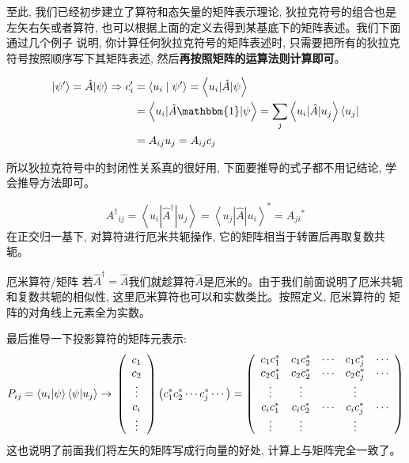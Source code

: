 至此, 我们已经初步建立了算符和态矢量的矩阵表示理论, 狄拉克符号的组合也是左矢右矢或者算符, 也可以根据上面的定义去得到某基底下的矩阵表述。我们下面通过几个例子
说明, 你计算任何狄拉克符号的矩阵表述时, 只需要把所有的狄拉克符号按照顺序写下其矩阵表述, 然后\textbf{再按照矩阵的运算法则计算即可}。

\begin{equation*}
    \begin{aligned}
        \left|\psi^{\prime}\right\rangle=\hat{A}|\psi\rangle \Rightarrow c_{i}^{\prime} &=\left\langle u_{i} \mid \psi^{\prime}\right\rangle=\left\langle u_{i}|\hat{A}| \psi\right\rangle \\
        &=\left\langle u_{i}|\hat{A} \mathbbm{1}| \psi\right\rangle=\sum_{j}\left\langle u_{i}|\hat{A}| u_{j}\right\rangle\left\langle u_{j}\right| \\
        &=A_{i j} u_{j}=A_{i j} c_{j}
    \end{aligned}
\end{equation*}
\begin{thinknote}
    所以狄拉克符号中的封闭性关系真的很好用, 下面要推导的式子都不用记结论, 学会推导方法即可。
\end{thinknote}
\begin{equation*}
    \boxed{
        A^{\dagger}{ }_{i j}=\left\langle u_{i}\left|\hat{A}^{\dagger}\right| u_{j}\right\rangle=\left\langle u_{j}|\hat{A}| u_{i}\right\rangle^{*}=A_{j i}{ }^{*}
    }
    \end{equation*}
在正交归一基下, 对算符进行厄米共轭操作, 它的矩阵相当于转置后再取复数共轭。
\begin{define}{厄米算符/矩阵}
    若$\hat{A}^\dagger=\hat{A}$我们就趁算符$\hat{A}$是厄米的。由于我们前面说明了厄米共轭和复数共轭的相似性, 这里厄米算符也可以和实数类比。按照定义, 厄米算符的
    矩阵的对角线上元素全为实数。
\end{define}
最后推导一下投影算符的矩阵元表示:
\begin{equation*}
    P_{ij} =\left\langle u_i|\psi\right\rangle\left\langle\psi| u_j \right\rangle\rightarrow\\
    \left(\begin{array}{c}
        c_{1} \\
        c_{2} \\
        \vdots \\
        c_{i} \\
        \vdots
        \end{array}\right)\left(c_{1}^{*} c_{2}^{*} \cdots c_{j}^{*} \cdots\right)=\left(\begin{array}{ccccc}
        c_{1} c_{1}^{*} & c_{1} c_{2}^{*} & \cdots & c_{1} c_{j}^{*} & \cdots \\
        c_{2} c_{1}^{*} & c_{2} c_{2}^{*} & \cdots & c_{2} c_{j}^{*} & \cdots \\
        \vdots & \vdots & & \vdots & \\
        c_{i} c_{1}^{*} & c_{i} c_{2}^{*} & \cdots & c_{i} c_{j}^{*} & \cdots \\
        \vdots & \vdots & & \vdots &
        \end{array}\right)
\end{equation*}
这也说明了前面我们将左矢的矩阵写成行向量的好处, 计算上与矩阵完全一致了。

